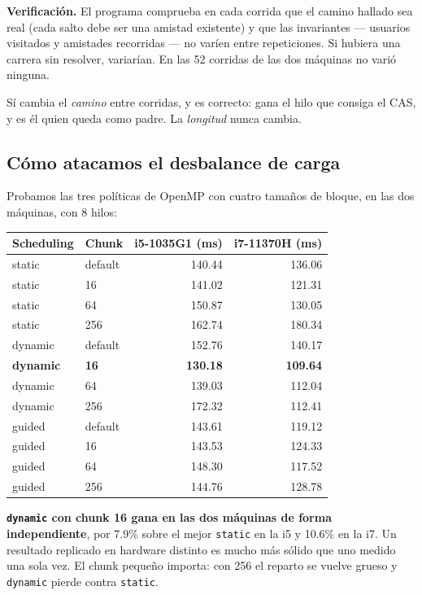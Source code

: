\documentclass[11pt,a4paper]{article}
\begin{document}
\textbf{Verificación.} El programa comprueba en cada corrida que el camino
hallado sea real (cada salto debe ser una amistad existente) y que las
invariantes --- usuarios visitados y amistades recorridas --- no varíen entre
repeticiones. Si hubiera una carrera sin resolver, variarían. En las 52
corridas de las dos máquinas no varió ninguna.

Sí cambia el \emph{camino} entre corridas, y es correcto: gana el hilo que
consiga el CAS, y es él quien queda como padre. La \emph{longitud} nunca
cambia.

\subsection*{Cómo atacamos el desbalance de carga}

Probamos las tres políticas de OpenMP con cuatro tamaños de bloque, en las dos
máquinas, con 8 hilos:

\begin{center}
\begin{tabular}{llrr}
\toprule
\textbf{Scheduling} & \textbf{Chunk} & \textbf{i5-1035G1 (ms)} & \textbf{i7-11370H (ms)} \\
\midrule
static  & default & 140.44 & 136.06 \\
static  & 16      & 141.02 & 121.31 \\
static  & 64      & 150.87 & 130.05 \\
static  & 256     & 162.74 & 180.34 \\
dynamic & default & 152.76 & 140.17 \\
\textbf{dynamic} & \textbf{16} & \textbf{130.18} & \textbf{109.64} \\
dynamic & 64      & 139.03 & 112.04 \\
dynamic & 256     & 172.32 & 112.41 \\
guided  & default & 143.61 & 119.12 \\
guided  & 16      & 143.53 & 124.33 \\
guided  & 64      & 148.30 & 117.52 \\
guided  & 256     & 144.76 & 128.78 \\
\bottomrule
\end{tabular}
\end{center}

\textbf{\texttt{dynamic} con chunk 16 gana en las dos máquinas de forma
independiente}, por 7.9\% sobre el mejor \texttt{static} en la i5 y 10.6\% en
la i7. Un resultado replicado en hardware distinto es mucho más sólido que uno
medido una sola vez. El chunk pequeño importa: con 256 el reparto se vuelve
grueso y \texttt{dynamic} pierde contra \texttt{static}.
\end{document}
